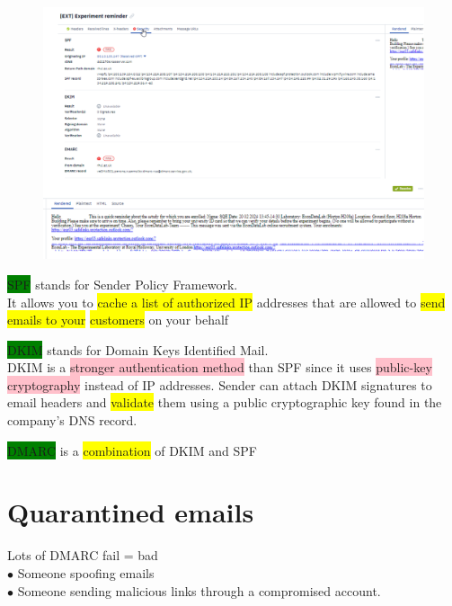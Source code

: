 \documentclass[tikz,border=10pt]{project_plan}
\newcommand{\bulletPoint}{\hspace{-3.1pt}$\bullet$ \hspace{5pt}}
\begin{document}
\begin{figure}[H]
  \centering
  \includegraphics[width=\linewidth]{phishtool.png}
\end{figure}

\colorbox{green}{SPF} stands for Sender Policy Framework.\\
It allows you to \colorbox{yellow}{cache a list of authorized IP} addresses that are allowed to
\colorbox{yellow}{send emails to your} \colorbox{yellow}{customers} on your behalf

\colorbox{green}{DKIM} stands for Domain Keys Identified Mail.\\
DKIM is a \colorbox{pink}{stronger authentication method} than SPF since it uses \colorbox{pink}{public-key
  cryptography} instead of IP addresses. Sender can attach DKIM signatures to
email headers and \colorbox{yellow}{validate} them using a public cryptographic key
found in the company's DNS record.

\colorbox{green}{DMARC} is a \colorbox{yellow}{combination} of DKIM and SPF

\section{Quarantined emails}

Lots of DMARC fail = bad\\
\bulletPoint Someone spoofing emails\\
\bulletPoint Someone sending malicious links through a compromised account.
\end{document}
